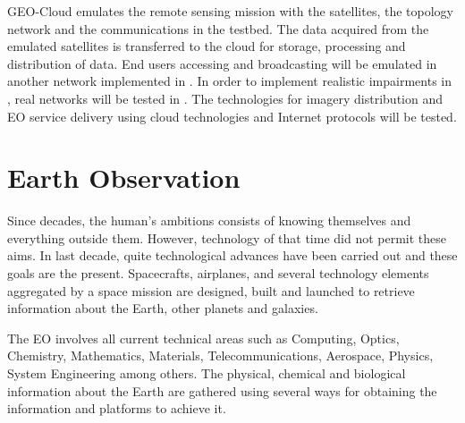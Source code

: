 GEO-Cloud  emulates the remote sensing mission with the satellites, the
topology network and the communications in the \vw testbed. The data
acquired from the emulated satellites is transferred to the \bonfire cloud
for storage, processing and distribution of data. End users accessing and
broadcasting will be emulated in another network implemented in \vw. In
order to implement realistic impairments in \vw, real networks will be
tested in \pl.  The technologies for imagery distribution and \ac{EO}
service delivery using cloud technologies and Internet protocols will be tested.

\section{Earth Observation}

Since decades, the human's ambitions consists of knowing themselves and
everything outside them. However, technology of that time did not permit these
aims. In last decade, quite technological advances have been carried out and
these goals are the present. Spacecrafts, airplanes, and several technology
elements aggregated by a space mission are designed, built and launched to
retrieve information about the Earth, other planets and galaxies.

The \ac{EO} involves all current technical areas such as Computing, Optics,
Chemistry, Mathematics, Materials, Telecommunications, Aerospace, Physics,
System Engineering among others. The physical, chemical and biological
information about the Earth are gathered using several ways for obtaining the
information and platforms to achieve it.

